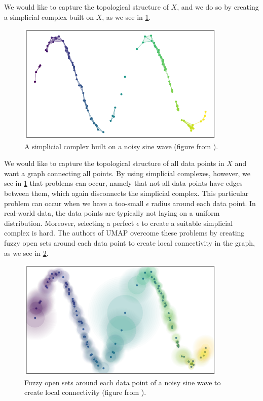 We would like to capture the topological structure of $X$, and we do so by creating a simplicial complex built on $X$, as we see in \cref{fig:how_umap_works_basic_graph}.
\begin{figure}[H]
    \centering
    \includegraphics[width=10cm]{thesis/figures/how_umap_works_basic_graph.png}
    \caption{A simplicial complex built on a noisy sine wave (figure from \cite{how-umap-works-2018}).}
    \label{fig:how_umap_works_basic_graph}
\end{figure}
We would like to capture the topological structure of all data points in $X$ and want a graph connecting all points. By using simplicial complexes, however, we see in \cref{fig:how_umap_works_basic_graph} that problems can occur, namely that not all data points have edges between them, which again disconnects the simplicial complex. This particular problem can occur when we have a too-small $\epsilon$ radius around each data point. In real-world data, the data points are typically not laying on a uniform distribution. Moreover, selecting a perfect $\epsilon$ to create a suitable simplicial complex is hard. The authors of UMAP overcome these problems by creating fuzzy open sets around each data point to create local connectivity in the graph, as we see in \cref{fig:how_umap_works_umap_open_cover}.
\begin{figure}[H]
    \centering
    \includegraphics[width=10cm]{thesis/figures/how_umap_works_umap_open_cover.png}
    \caption{Fuzzy open sets around each data point of a noisy sine wave to create local connectivity (figure from \cite{how-umap-works-2018}).}
    \label{fig:how_umap_works_umap_open_cover}
\end{figure}
